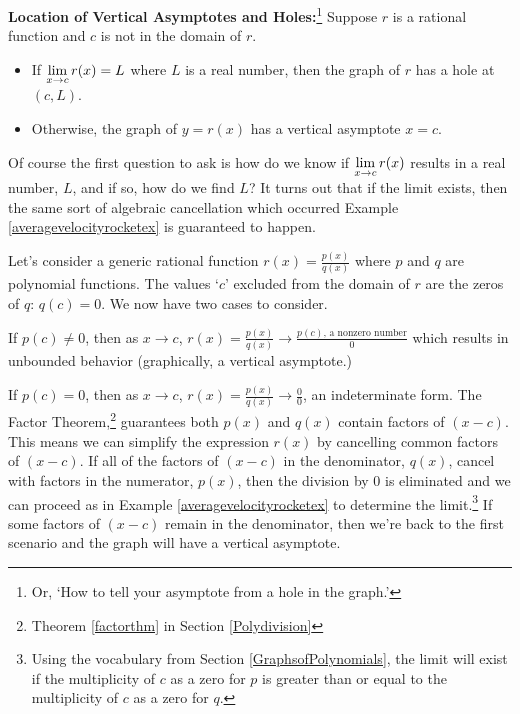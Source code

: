 \colorbox{ResultColor}{\bbm
\begin{thm}  \textbf{Location of Vertical Asymptotes and Holes:}\footnote{Or, `How to tell your asymptote from a hole in the graph.'}  \label{vavshole}  Suppose $r$ is a rational function and $c$ is not in the domain of $r$.  

\begin{itemize}

\item If $\ds{\lim_{x \rightarrow c} r(x) = L}$  where $L$ is a real number, then the graph of $r$ has a hole at $(c, L)$.

\item  Otherwise, the graph of $y = r(x)$ has a vertical asymptote $x = c$.

\end{itemize}

\end{thm}

\ebm}

Of course the first question to ask is how do we  know if $\ds{\lim_{x \rightarrow c} r(x)}$ results in a real number, $L$, and if so, how do we find $L$?  It turns out that if the limit exists, then the same sort of algebraic cancellation which occurred  Example \ref{averagevelocityrocketex} is guaranteed to happen. 

Let's consider a generic rational function $r(x) = \frac{p(x)}{q(x)}$ where $p$ and $q$ are polynomial functions.  The values `$c$' excluded from the domain of $r$ are the zeros of $q$:  $q(c) =0$. We now have two cases to consider.   

If $p(c) \neq 0$, then as $x \rightarrow c$, $r(x)  = \frac{p(x)}{q(x)} \rightarrow \frac{\text{$p(c)$, a nonzero number}}{0}$  which results in unbounded behavior (graphically, a vertical asymptote.)


If $p(c) = 0$, then  as $x \rightarrow c$, $r(x)  = \frac{p(x)}{q(x)} \rightarrow \frac{0}{0}$, an indeterminate form.  The Factor Theorem,\footnote{Theorem \ref{factorthm} in Section \ref{Polydivision}} guarantees both $p(x)$ and $q(x)$ contain factors of $(x-c)$.  This means we can simplify the expression $r(x)$ by cancelling common factors of $(x-c)$.  If all of the factors of $(x-c)$ in the denominator, $q(x)$, cancel with factors in the numerator, $p(x)$, then the division by $0$ is eliminated and we can proceed as in Example \ref{averagevelocityrocketex} to determine the limit.\footnote{Using the vocabulary from Section \ref{GraphsofPolynomials}, the limit will exist if the multiplicity of $c$ as a zero for $p$ is greater than or equal to the multiplicity of $c$ as a zero for $q$.}  If some factors of $(x-c)$ remain in the denominator, then we're back to the first scenario and the graph will have a vertical asymptote. 

